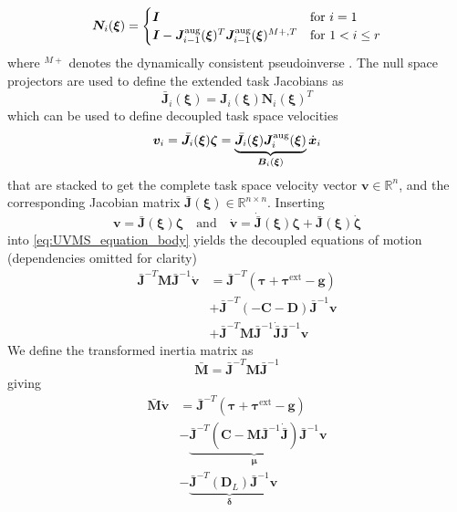 \documentclass[../main.tex]{subfiles}
\begin{document}
\begin{equation}
    \label{eq:nullspace_proj}
    \bm{N}_i(\bm{\xi}) = \begin{cases}
        \bm{I}  &\text{for } i = 1\\
        \bm{I} - \bm{J}_{i-1}^{\rm aug}(\bm{\xi})^{T} \bm{J}_{i-1}^{\rm aug}(\bm{\xi})^{M+, T} &\text{for } 1 < i \leq r
    \end{cases}
\end{equation}
where $^{M+}$ denotes the dynamically consistent pseudoinverse \cite{Dietrich2015}. The null space projectors are used to define the extended task Jacobians as
\begin{equation}
   \bar{\bm{J}}_i(\bm{\xi}) = \bm{J}_i(\bm{\xi}) \bm{N}_i(\bm{\xi})^T
\end{equation}
which can be used to define decoupled task space velocities
\begin{equation}
   \bm{v}_i = \bar{\bm{J}}_i(\bm{\xi}) \bm{\zeta} = \underbrace{\bar{\bm{J}}_i(\bm{\xi}) \bm{J}^{\rm aug}_i(\bm{\xi})}_{\bm{B}_i(\bm{\xi})} \dot{\bm{x}}_i
\end{equation}
that are stacked to get the complete task space velocity vector $\bm{v} \in \mathbb{R}^n$, and the corresponding Jacobian matrix $\bar{\bm{J}}(\bm{\xi}) \in \mathbb{R}^{n \times n}$. Inserting
\begin{equation}
   \bm{v} = \bar{\bm{J}}(\bm{\xi}) \bm{\bm{\zeta}} \quad \text{and} \quad \dot{\bm{v}} = \dot{\bar{\bm{J}}}(\bm{\xi}) \bm{\bm{\zeta}} + \bar{\bm{J}}(\bm{\xi}) \dot{\bm{\bm{\zeta}}}
\end{equation}
into \eqref{eq:UVMS_equation_body} yields the decoupled equations of motion (dependencies omitted for clarity)
\begin{align}
    \bar{\bm{J}}^{-T}\bm{M} \bar{\bm{J}}^{-1} \dot{\bm{v}}
    &= \bar{\bm{J}}^{-T}(\bm{\tau} + \bm{\tau}^{\text{ext}} - \bm{g})\\
    &+ \bar{\bm{J}}^{-T}\left(
        -\bm{C} - \bm{D}
    \right)\bar{\bm{J}}^{-1} \bm{v} \nonumber \\
    &+ \bar{\bm{J}}^{-T} \bm{M}\bar{\bm{J}}^{-1}\dot{\bar{\bm{J}}}\bar{\bm{J}}^{-1}\bm{v} \nonumber
\end{align}
We define the transformed inertia matrix as
\begin{equation}
    \bar{\bm{M}} = \bar{\bm{J}}^{-T}\bm{M} \bar{\bm{J}}^{-1}
\end{equation}
giving
\begin{align}
    \bar{\bm{M}} \dot{\bm{v}}
    &= \bar{\bm{J}}^{-T}(\bm{\tau}+ \bm{\tau}^{\text{ext}} - \bm{g}) \\
    &- \underbrace{
        \bar{\bm{J}}^{-T} \left(
        \bm{C} - \bm{M}\bar{\bm{J}}^{-1}\dot{\bar{\bm{J}}}
        \right)\bar{\bm{J}}^{-1}
    }_{\bm{\mu}} \bm{v}
    \nonumber \\
    &- \underbrace{
        \bar{\bm{J}}^{-T} \left(\bm{D}_{L}\right)\bar{\bm{J}}^{-1}
    }_{\bm{\delta}}\bm{v}
    \nonumber
\end{align}
\end{document}
